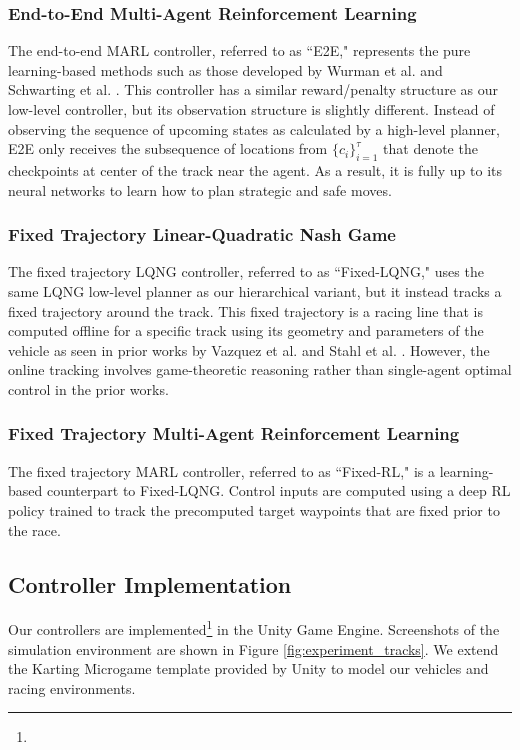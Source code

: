 \subsubsection{End-to-End Multi-Agent Reinforcement Learning}
The end-to-end MARL controller, referred to as ``E2E," represents the pure learning-based methods such as those developed by Wurman et al. and Schwarting et al. \cite{sonyai, Schwarting2021}. This controller has a similar reward/penalty structure as our low-level controller, but its observation structure is slightly different. Instead of observing the sequence of upcoming states as calculated by a high-level planner, E2E only receives the subsequence of locations from $\{c_i\}_{i=1}^{\tau}$ that denote the checkpoints at center of the track near the agent. As a result, it is fully up to its neural networks to learn how to plan strategic and safe moves. 

\subsubsection{Fixed Trajectory Linear-Quadratic Nash Game}
The fixed trajectory LQNG controller, referred to as ``Fixed-LQNG," uses the same LQNG low-level planner as our hierarchical variant, but it instead tracks a fixed trajectory around the track. This fixed trajectory is a racing line that is computed offline for a specific track using its geometry and parameters of the vehicle as seen in prior works by Vazquez et al. and Stahl et al. \cite{Vazquez2020, Stahl2019_2}. However, the online tracking involves game-theoretic reasoning rather than single-agent optimal control in the prior works.

\subsubsection{Fixed Trajectory Multi-Agent Reinforcement Learning}
The fixed trajectory MARL controller, referred to as ``Fixed-RL," is a learning-based counterpart to Fixed-LQNG. Control inputs are computed using a deep RL policy trained to track the precomputed target waypoints that are fixed prior to the race.  
\subsection{Controller Implementation}
Our controllers are implemented\footnote{\codeurl} in the Unity Game Engine. Screenshots of the simulation environment are shown in Figure \ref{fig:experiment_tracks}. We extend the Karting Microgame template provided by Unity \cite{microkarting} to model our vehicles and racing environments. 

